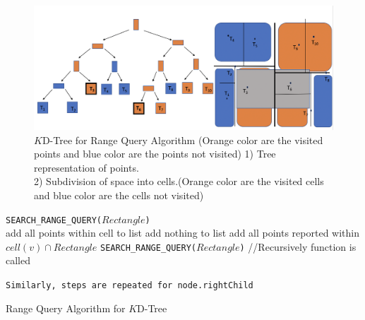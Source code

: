 \begin{figure}[htp]
    \centering
    \includegraphics[width=1.0\textwidth]{graphs/KD_Tree_Range_Query_Algorithm.png}
    \caption{$K$D-Tree for Range Query Algorithm (Orange color are the visited points and blue color are the points not visited) 
    1) Tree representation of points. \\
    2) Subdivision of space into cells.(Orange color are the visited cells and blue color are the cells not visited) 
    }
    \label{fig:KD-Tree_for_Range_Query_Algorithm}
\end{figure}



\begin{algorithm}[H]
    \SetAlgoLined
    \texttt{SEARCH\_RANGE\_QUERY($Rectangle$)}\\
        {
                {add all points within cell to list}
                {add nothing to list}
            {add all points reported within $cell(v) \cap Rectangle$}
        }
        {
            \texttt{SEARCH\_RANGE\_QUERY($Rectangle$)} //Recursively function is called\\
        }
        
    \texttt{Similarly, steps are repeated for node.rightChild}
    
    \caption{Range Query Algorithm for $K$D-Tree}
    \label{Range_Query_Algorithm_$K$D-Tree}
\end{algorithm}

